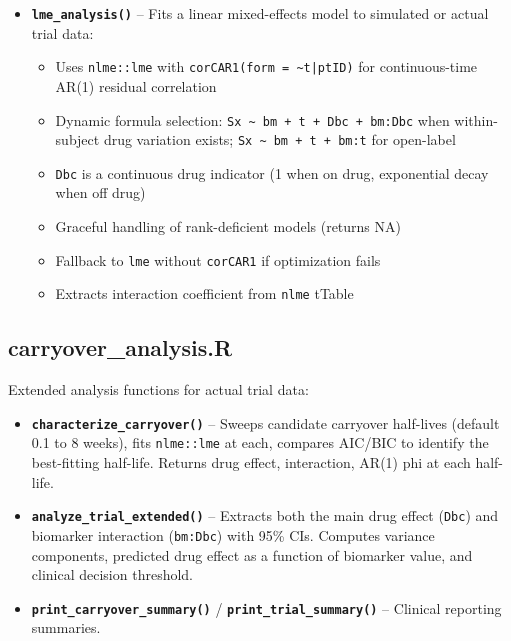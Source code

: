 \documentclass[11pt]{article}
\begin{document}
\begin{itemize}
  \item \textbf{\texttt{lme\_analysis()}} -- Fits a linear mixed-effects model
    to simulated or actual trial data:
    \begin{itemize}
      \item Uses \texttt{nlme::lme} with \texttt{corCAR1(form = \~{}t|ptID)} for
        continuous-time AR(1) residual correlation
      \item Dynamic formula selection: \texttt{Sx \~{} bm + t + Dbc +
        bm:Dbc} when within-subject drug variation exists;
        \texttt{Sx \~{} bm + t + bm:t} for open-label
      \item \texttt{Dbc} is a continuous drug indicator (1 when on drug,
        exponential decay when off drug)
      \item Graceful handling of rank-deficient models (returns NA)
      \item Fallback to \texttt{lme} without \texttt{corCAR1} if optimization
        fails
      \item Extracts interaction coefficient from \texttt{nlme} tTable
    \end{itemize}
\end{itemize}

\subsection{carryover\_analysis.R}

Extended analysis functions for actual trial data:

\begin{itemize}
  \item \textbf{\texttt{characterize\_carryover()}} -- Sweeps candidate
    carryover half-lives (default 0.1 to 8 weeks), fits
    \texttt{nlme::lme} at each, compares AIC/BIC to identify the
    best-fitting half-life. Returns drug effect, interaction,
    AR(1) phi at each half-life.

  \item \textbf{\texttt{analyze\_trial\_extended()}} -- Extracts both the main
    drug effect (\texttt{Dbc}) and biomarker interaction (\texttt{bm:Dbc})
    with 95\% CIs. Computes variance components, predicted
    drug effect as a function of biomarker value, and
    clinical decision threshold.

  \item \textbf{\texttt{print\_carryover\_summary()}} / \textbf{\texttt{print\_trial\_summary()}}
    -- Clinical reporting summaries.
\end{itemize}
\end{document}
